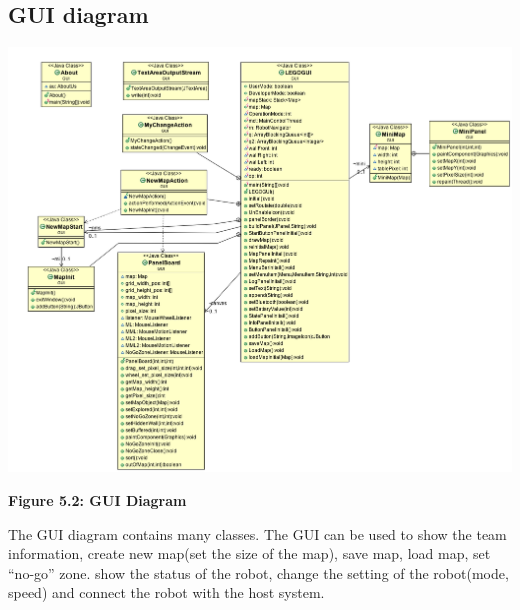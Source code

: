 \documentclass[11pt, a4paper]{report}
\begin{document}
\subsection{GUI diagram}
 \begin{center}
 \includegraphics[width=18.20cm]{GUI.png}
\end{center}
\begin{center}
\textbf {Figure 5.2: GUI Diagram} \\[0.3cm]
\end{center}
The GUI diagram contains many classes. The GUI can be used to show the team information, create new map(set the size of the map), save map, load map, set ``no-go'' zone. show the status of the robot, change the setting of the robot(mode, speed) and connect the robot with the host system. 
\pagebreak
\end{document}
